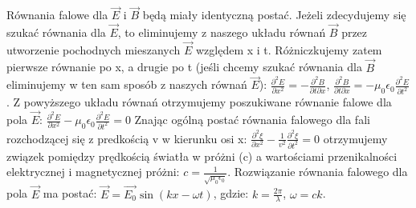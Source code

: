 Równania falowe dla $ \vec{E} $ i $ \vec{B} $ będą miały identyczną postać. Jeżeli zdecydujemy się szukać równania dla $ \vec{E} $, to eliminujemy z naszego układu równań $ \vec{B} $ przez utworzenie pochodnych mieszanych $ \vec{E} $ względem x i t. Różniczkujemy zatem pierwsze równanie po x, a drugie po t (jeśli chcemy szukać równania dla $ \vec{B} $ eliminujemy w ten sam sposób z naszych równań $ \vec{E} $):\newline
$ \frac{\partial^2 E}{\partial x^2} = -\frac{\partial^2 B}{\partial t \partial x} $,\newline
$ \frac{\partial^2 B}{\partial t \partial x} = - \mu_0 \epsilon_0 \frac{\partial^2 E}{\partial t^2} $.\newline
Z powyższego układu równań otrzymujemy poszukiwane równanie falowe dla pola $ \vec{E} $:\newline
$ \frac{\partial^2 E}{\partial x^2} - \mu_0 \epsilon_0 \frac{\partial^2 E}{\partial t^2} = 0 $\newline
Znając ogólną postać równania falowego dla fali rozchodzącej się z predkością v w kierunku osi x:\newline
$ \frac{\partial^2 \xi}{\partial x^2} - \frac{1}{v^2} \frac{\partial^2 \xi}{\partial t^2} = 0 $\newline
otrzymujemy związek pomiędzy prędkością światła w próżni (c) a wartościami przenikalności elektrycznej i magnetycznej próżni: \newline
$ c = \frac{1}{\sqrt{\mu_0 \epsilon_0}} $.\newline
Rozwiązanie równania falowego dla pola $ \vec{E} $ ma postać:\newline
$ \vec{E} = \vec{E_0}\sin(kx - \omega t) $,\newline
gdzie: $ k = \frac{2\pi}{\lambda} $, $ \omega = ck $.